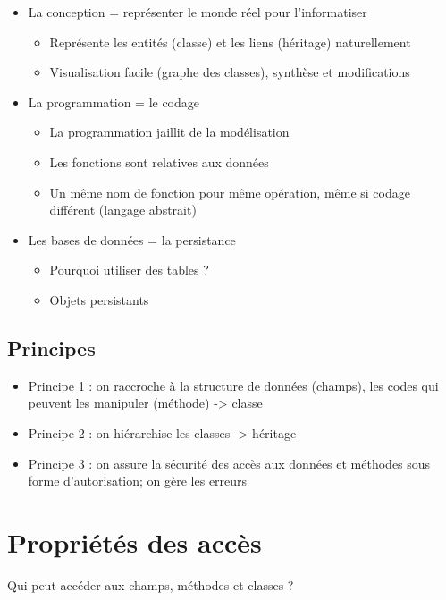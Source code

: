 \documentclass{article}
\begin{document}
\begin{itemize}
	\item La conception = représenter le monde réel pour l'informatiser
	\begin{itemize}
		\item Représente les entités (classe) et les liens (héritage) naturellement
		\item Visualisation facile (graphe des classes), synthèse et modifications
	\end{itemize}
	\item La programmation = le codage
	\begin{itemize}
		\item La programmation jaillit de la modélisation
		\item Les fonctions sont relatives aux données
		\item Un même nom de fonction pour même opération, même si codage
			différent (langage abstrait)
	\end{itemize}
	\item Les bases de données = la persistance
	\begin{itemize}
		\item Pourquoi utiliser des tables ?
		\item Objets persistants
	\end{itemize}
\end{itemize}

\subsection{Principes}

\begin{itemize}
\item Principe 1 : on raccroche à la structure de données (champs),
	les codes qui peuvent les manipuler (méthode) -> classe
\item Principe 2 : on hiérarchise les classes -> héritage
\item Principe 3 : on assure la sécurité des accès aux données et
	méthodes sous forme d’autorisation; on gère les erreurs
\end{itemize}

\section{Propriétés des accès}
Qui peut accéder aux champs, méthodes et classes ?
\end{document}
